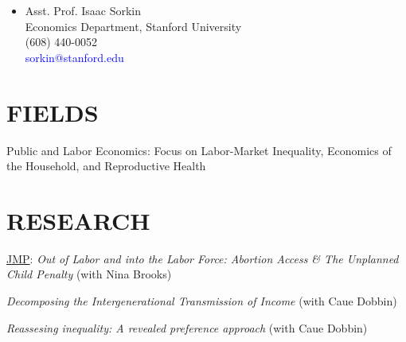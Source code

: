 \documentclass[margin]{res} %
\newcommand{\rootFolder}{/Users/tomzohar/Dropbox/}
\begin{document}
\begin{resume}
\begin{multicols}{2}
\begin{itemize}
		 \item[] Asst. Prof. Isaac Sorkin\\
		Economics Department, Stanford University \\
		(608) 440-0052 \\
		\textcolor{blue}{sorkin@stanford.edu} \\

	\end{itemize}
\end{multicols}
 
 
\section{FIELDS}  
 Public and Labor Economics: Focus on Labor-Market Inequality, Economics of the Household, and Reproductive Health
 

\section{ RESEARCH} 

\href{https://www.dropbox.com/s/ywg4js164qhxt0q/cv_TomZohar.pdf?dl=0}{JMP}: \textit{Out of Labor and into the Labor Force: Abortion Access \& The Unplanned Child Penalty} (with Nina Brooks)




\textit{Decomposing the Intergenerational Transmission of Income} (with Caue Dobbin)


\textit{Reassesing inequality: A revealed preference approach} (with Caue Dobbin)
%




\end{resume}
\end{document}
